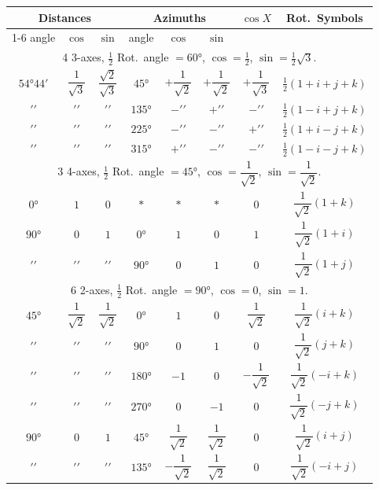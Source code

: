 \documentclass[11pt,a4paper]{article}
\begin{document}
\begin{center}
\small
\begin{tabular}{|c|c|c|c|c|c|c|c|}
\hline
\multicolumn{3}{|c|}{Distances} & \multicolumn{3}{c|}{Azimuths} & \multirow{2}{*}{$\cos X$} & \multirow{2}{*}{Rot.~Symbols} \\
\cline{1-6}
angle & $\cos$ & $\sin$ & angle & $\cos$ & $\sin$ & & \\
\hline
\multicolumn{8}{c}{4 3-axes, $\tfrac{1}{2}$ Rot.~angle $= 60°$, $\cos = \tfrac{1}{2}$, $\sin = \tfrac{1}{2}\surd 3$.} \\
\hline
$54°44'$ & $\dfrac{1}{\surd 3}$ & $\dfrac{\surd 2}{\surd 3}$ & $45°$ & $+\dfrac{1}{\surd 2}$ & $+\dfrac{1}{\surd 2}$ & $+\dfrac{1}{\surd 3}$ & $\tfrac{1}{2}(1 + i + j + k)$ \\
$\prime\prime$ & $\prime\prime$ & $\prime\prime$ & $135°$ & $-\prime\prime$ & $+\prime\prime$ & $-\prime\prime$ & $\tfrac{1}{2}(1 - i + j + k)$ \\
$\prime\prime$ & $\prime\prime$ & $\prime\prime$ & $225°$ & $-\prime\prime$ & $-\prime\prime$ & $+\prime\prime$ & $\tfrac{1}{2}(1 + i - j + k)$ \\
$\prime\prime$ & $\prime\prime$ & $\prime\prime$ & $315°$ & $+\prime\prime$ & $-\prime\prime$ & $-\prime\prime$ & $\tfrac{1}{2}(1 - i - j + k)$ \\
\hline
\multicolumn{8}{c}{3 4-axes, $\tfrac{1}{2}$ Rot.~angle $= 45°$, $\cos = \dfrac{1}{\surd 2}$, $\sin = \dfrac{1}{\surd 2}$.} \\
\hline
$0°$ & $1$ & $0$ & $*$ & $*$ & $*$ & $0$ & $\dfrac{1}{\surd 2}(1 + k)$ \\
$90°$ & $0$ & $1$ & $0°$ & $1$ & $0$ & $1$ & $\dfrac{1}{\surd 2}(1 + i)$ \\
$\prime\prime$ & $\prime\prime$ & $\prime\prime$ & $90°$ & $0$ & $1$ & $0$ & $\dfrac{1}{\surd 2}(1 + j)$ \\
\hline
\multicolumn{8}{c}{6 2-axes, $\tfrac{1}{2}$ Rot.~angle $= 90°$, $\cos = 0$, $\sin = 1$.} \\
\hline
$45°$ & $\dfrac{1}{\surd 2}$ & $\dfrac{1}{\surd 2}$ & $0°$ & $1$ & $0$ & $\dfrac{1}{\surd 2}$ & $\dfrac{1}{\surd 2}(i + k)$ \\
$\prime\prime$ & $\prime\prime$ & $\prime\prime$ & $90°$ & $0$ & $1$ & $0$ & $\dfrac{1}{\surd 2}(j + k)$ \\
$\prime\prime$ & $\prime\prime$ & $\prime\prime$ & $180°$ & $-1$ & $0$ & $-\dfrac{1}{\surd 2}$ & $\dfrac{1}{\surd 2}(-i + k)$ \\
$\prime\prime$ & $\prime\prime$ & $\prime\prime$ & $270°$ & $0$ & $-1$ & $0$ & $\dfrac{1}{\surd 2}(-j + k)$ \\
$90°$ & $0$ & $1$ & $45°$ & $\dfrac{1}{\surd 2}$ & $\dfrac{1}{\surd 2}$ & $0$ & $\dfrac{1}{\surd 2}(i + j)$ \\
$\prime\prime$ & $\prime\prime$ & $\prime\prime$ & $135°$ & $-\dfrac{1}{\surd 2}$ & $\dfrac{1}{\surd 2}$ & $0$ & $\dfrac{1}{\surd 2}(-i + j)$ \\
\hline
\end{tabular}
\end{center}
\end{document}
